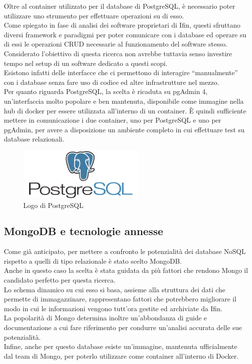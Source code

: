 \noindent Oltre al container utilizzato per il database di PostgreSQL, è necessario poter utilizzare uno strumento per effettuare operazioni su di esso.\\
Come spiegato in fase di analisi dei software proprietari di Ifin, questi sfruttano diversi framework e paradigmi per poter comunicare con i database ed operare su di essi le operazioni CRUD necessarie al funzionamento del software stesso. Considerato l'obiettivo di questa ricerca non avrebbe tuttavia senso investire tempo nel setup di un software dedicato a questi scopi.\\
Esistono infatti delle interfacce che ci permettono di interagire ``manualmente'' con i database senza fare uso di codice ed altre infrastrutture nel mezzo.\\
Per quanto riguarda PostgreSQL, la scelta è ricaduta su pgAdmin 4, un'interfaccia molto popolare e ben mantenuta, disponibile come immagine nella hub di docker per essere utilizzata all'interno di un container. È quindi sufficiente mettere in comunicazione i due container, uno per PostgreSQL e uno per pgAdmin, per avere a disposizione un ambiente completo in cui effettuare test su database relazionali.

\begin{figure}[htbp]
\begin{center}
\includegraphics[height=7em]{immagini/tecnologies-logos/postgresql-logo.png}
\caption{Logo di PostgreSQL}
\end{center}
\end{figure}

\subsection{MongoDB e tecnologie annesse}
Come già anticipato, per mettere a confronto le potenzialità dei database NoSQL rispetto a quelli di tipo relazionale è stato scelto MongoDB.\\
Anche in questo caso la scelta è stata guidata da più fattori che rendono Mongo il candidato perfetto per questa ricerca.\\
Lo schema dinamico su cui esso si basa, assieme alla struttura dei dati che permette di immagazzinare, rappresentano fattori che potrebbero migliorare il modo in cui le informazioni vengono tutt'ora gestite ed archiviate da Ifin.\\
La popolarità di Mongo determina inoltre un'abbondanza di guide e documentazione a cui fare riferimento per condurre un'analisi accurata delle sue potenzialità.\\
Infine, anche per questo database esiste un'immagine, mantenuta ufficialmente dal team di Mongo, per poterlo utilizzare come container all'interno di Docker.\\

